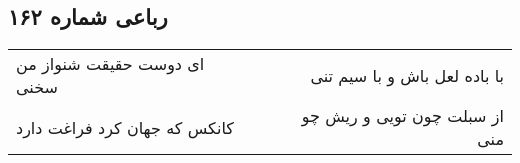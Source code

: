 \begin{center}
\section*{رباعی شماره ۱۶۲}
\label{sec:sh162}
\begin{longtable}{l p{0.5cm} r}
ای دوست حقیقت شنواز من سخنی
&&
با باده لعل باش و با سیم تنی
\\
کانکس که جهان کرد فراغت دارد
&&
از سبلت چون تویی و ریش چو منی
\\
\end{longtable}
\end{center}

